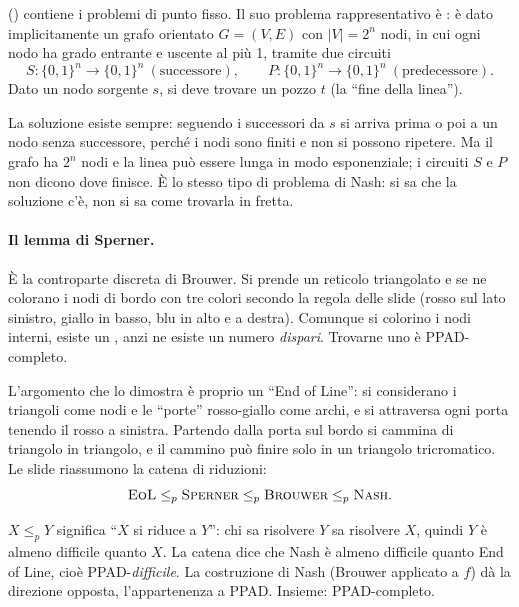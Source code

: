 \begin{definizione}
 () contiene i problemi di punto
fisso. Il suo problema rappresentativo è : è dato implicitamente un grafo
orientato $G = (V,E)$ con $|V| = 2^n$ nodi, in cui ogni nodo ha grado entrante e uscente al
più 1, tramite due circuiti
\[
  S : \{0,1\}^n \to \{0,1\}^n \ (\text{successore}),\qquad
  P : \{0,1\}^n \to \{0,1\}^n \ (\text{predecessore}).
\]
Dato un nodo sorgente $s$, si deve trovare un pozzo $t$ (la ``fine della linea'').
\end{definizione}

\begin{osservazione}
La soluzione esiste sempre: seguendo i successori da $s$ si arriva prima o poi a un nodo
senza successore, perché i nodi sono finiti e non si possono ripetere. Ma il grafo ha
$2^n$ nodi e la linea può essere lunga in modo esponenziale; i circuiti $S$ e $P$ non
dicono dove finisce. È lo stesso tipo di problema di Nash: si sa che la soluzione c'è,
non si sa come trovarla in fretta.
\end{osservazione}

\paragraph{Il lemma di Sperner.}
È la controparte discreta di Brouwer. Si prende un reticolo triangolato e se ne colorano i
nodi di bordo con tre colori secondo la regola delle slide (rosso sul lato sinistro, giallo
in basso, blu in alto e a destra). Comunque si colorino i nodi interni, esiste un
, anzi ne esiste un numero \emph{dispari}. Trovarne uno è
PPAD-completo.

L'argomento che lo dimostra è proprio un ``End of Line'': si considerano i triangoli come
nodi e le ``porte'' rosso-giallo come archi, e si attraversa ogni porta tenendo il rosso a
sinistra. Partendo dalla porta sul bordo si cammina di triangolo in triangolo, e il cammino
può finire solo in un triangolo tricromatico. Le slide riassumono la catena di riduzioni:
\[
  \textsc{EoL} \le_p \textsc{Sperner} \le_p \textsc{Brouwer} \le_p \textsc{Nash}.
\]

\begin{osservazione}
$X \le_p Y$ significa ``$X$ si riduce a $Y$'': chi sa risolvere $Y$ sa risolvere $X$, quindi
$Y$ è almeno difficile quanto $X$. La catena dice che Nash è almeno difficile quanto End of
Line, cioè PPAD-\emph{difficile}. La costruzione di Nash (Brouwer applicato a $f$) dà la
direzione opposta, l'appartenenza a PPAD. Insieme: PPAD-completo.
\end{osservazione}

